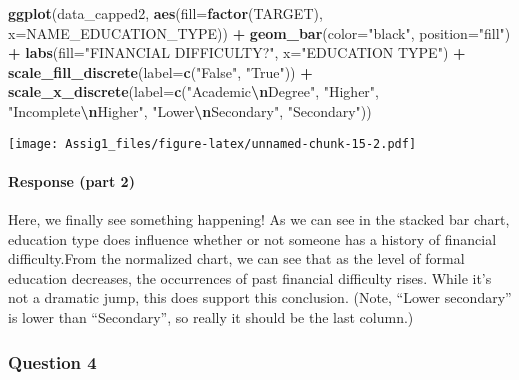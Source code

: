 \documentclass[
]{article}
\newenvironment{Shaded}{\begin{snugshade}}{\end{snugshade}}
\newcommand{\AttributeTok}[1]{\textcolor[rgb]{0.13,0.29,0.53}{#1}}
\newcommand{\FunctionTok}[1]{\textcolor[rgb]{0.13,0.29,0.53}{\textbf{#1}}}
\newcommand{\NormalTok}[1]{#1}
\newcommand{\SpecialCharTok}[1]{\textcolor[rgb]{0.81,0.36,0.00}{\textbf{#1}}}
\newcommand{\StringTok}[1]{\textcolor[rgb]{0.31,0.60,0.02}{#1}}
\begin{document}
\begin{Shaded}
\begin{Highlighting}[]
\FunctionTok{ggplot}\NormalTok{(data\_capped2, }\FunctionTok{aes}\NormalTok{(}\AttributeTok{fill=}\FunctionTok{factor}\NormalTok{(TARGET), }\AttributeTok{x=}\NormalTok{NAME\_EDUCATION\_TYPE)) }\SpecialCharTok{+}
  \FunctionTok{geom\_bar}\NormalTok{(}\AttributeTok{color=}\StringTok{"black"}\NormalTok{, }\AttributeTok{position=}\StringTok{"fill"}\NormalTok{) }\SpecialCharTok{+}
  \FunctionTok{labs}\NormalTok{(}\AttributeTok{fill=}\StringTok{"FINANCIAL DIFFICULTY?"}\NormalTok{, }\AttributeTok{x=}\StringTok{"EDUCATION TYPE"}\NormalTok{) }\SpecialCharTok{+}
  \FunctionTok{scale\_fill\_discrete}\NormalTok{(}\AttributeTok{label=}\FunctionTok{c}\NormalTok{(}\StringTok{"False"}\NormalTok{, }\StringTok{"True"}\NormalTok{)) }\SpecialCharTok{+}
  \FunctionTok{scale\_x\_discrete}\NormalTok{(}\AttributeTok{label=}\FunctionTok{c}\NormalTok{(}\StringTok{"Academic}\SpecialCharTok{\textbackslash{}n}\StringTok{Degree"}\NormalTok{, }\StringTok{"Higher"}\NormalTok{, }\StringTok{"Incomplete}\SpecialCharTok{\textbackslash{}n}\StringTok{Higher"}\NormalTok{, }\StringTok{"Lower}\SpecialCharTok{\textbackslash{}n}\StringTok{Secondary"}\NormalTok{, }\StringTok{"Secondary"}\NormalTok{))}
\end{Highlighting}
\end{Shaded}

\texttt{[image: Assig1\_files/figure-latex/unnamed-chunk-15-2.pdf]}

\hypertarget{response-part-2-1}{%
\paragraph{Response (part 2)}\label{response-part-2-1}}

Here, we finally see something happening! As we can see in the stacked
bar chart, education type does influence whether or not someone has a
history of financial difficulty.From the normalized chart, we can see
that as the level of formal education decreases, the occurrences of past
financial difficulty rises. While it's not a dramatic jump, this does
support this conclusion. (Note, ``Lower secondary'' is lower than
``Secondary'', so really it should be the last column.)

\hypertarget{question-4}{%
\subsubsection{Question 4}\label{question-4}}
\end{document}
